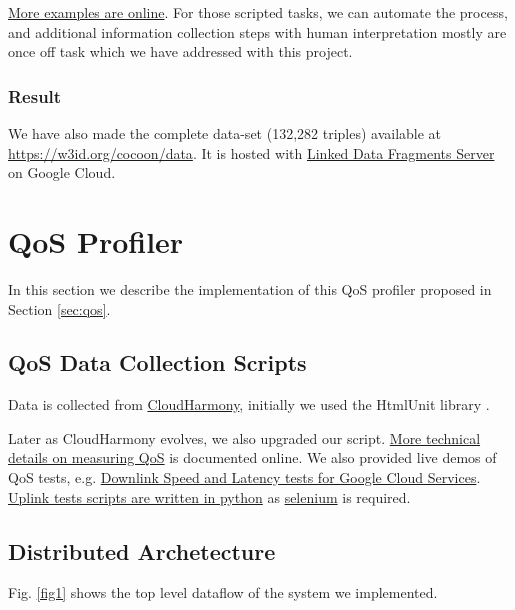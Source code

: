 \href{https://github.com/miranda-zhang/cloud-computing-schema/tree/master/example/sparql-generate}{More examples are online}. For those scripted tasks, we can automate the process, and additional information collection steps with human interpretation mostly are once off task which we have addressed with this project.

\subsubsection{Result}
We have also made the complete data-set (132,282 triples) available at
\href{https://w3id.org/cocoon/data}{https://w3id.org/cocoon/data}.
It is hosted with \href{http://linkeddatafragments.org/}{Linked Data Fragments Server} on Google Cloud.

\section{QoS Profiler}
In this section we describe the implementation of this QoS profiler proposed in Section \ref{sec:qos}.

\subsection{QoS Data Collection Scripts}
Data is collected from \href{https://cloudharmony.com}{CloudHarmony}, initially we used the HtmlUnit library \cite{htmlunit}.

Later as CloudHarmony evolves, we also upgraded our script.
\href{https://github.com/miranda-zhang/cloud-computing-schema/tree/master/example/cloudharmony}{More technical details on measuring QoS} is documented online. We also provided live demos of QoS tests, e.g.
\href{https://miranda-zhang.github.io/cloud-computing-schema/cloudharmony/google/test.html}{Downlink Speed and Latency tests for Google Cloud Services}.
\href{https://github.com/miranda-zhang/cloud-computing-schema/blob/master/example/cloudharmony/selenium/cloudharmony.py}{Uplink tests scripts are written in python}
as \href{https://github.com/miranda-zhang/cloud-computing-schema/tree/master/example/cloudharmony/selenium}{selenium} is required.

\subsection{Distributed Archetecture}
Fig. \ref{fig1} shows the top level dataflow of the system we implemented.

